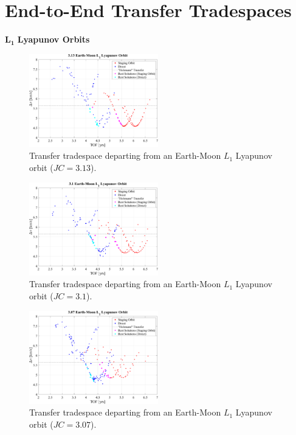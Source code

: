 \chapter{End-to-End Transfer Tradespaces}

$\pmb{L_{1}}$ \textbf{Lyapunov Orbits}
\begin{figure}[ht]
    \centering
    \includegraphics[width=0.5\textwidth]{figures/TradeSpace_L1Lyapunov_3_13.pdf}
    \caption{Transfer tradespace departing from an Earth-Moon $L_{1}$ Lyapunov orbit ($JC=3.13$).}
\end{figure}

\begin{figure}[ht]
    \centering
    \includegraphics[width=0.5\textwidth]{figures/TradeSpace_L1Lyapunov_3_10.pdf}
    \caption{Transfer tradespace departing from an Earth-Moon $L_{1}$ Lyapunov orbit ($JC=3.1$).}
\end{figure}
\clearpage

\begin{figure}[ht]
    \centering
    \includegraphics[width=0.5\textwidth]{figures/TradeSpace_L1Lyapunov_3_07.pdf}
    \caption{Transfer tradespace departing from an Earth-Moon $L_{1}$ Lyapunov orbit ($JC=3.07$).}
\end{figure}

